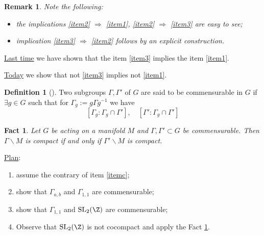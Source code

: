 \documentclass[a4paper,12pt]{article}
\newtheorem{remark}{Remark}
\newtheorem{fact}{Fact}
\theoremstyle{definition}
\newtheorem{definition}{Definition}
\renewcommand{\implies}{\Rightarrow}
\begin{document}
\begin{remark}
	Note the following:\begin{itemize}
		\item the implications \ref{item2} $\implies$ \ref{item1}, \ref{item2} $\implies$ \ref{item3} are easy to see;
		\item implication \ref{item3} $\implies$ \ref{item2} follows by an explicit construction.
	\end{itemize}
\end{remark}

\underline{Last time} we have shown that the item \ref{item3} implies the item \ref{item1}.

\underline{Today} we show that not \ref{item3} implies not \ref{item1}.

\begin{definition}[{\cite[p.36]{bergeron2016spectrum}}]
	Two subgroups $\Gamma,\Gamma'$ of $G$ are said to be commensurable in $G$ if $\exists g\in G$ such that for $\Gamma_{g}:=g\Gamma g^{-1}$ we have\begin{equation*}
		\left[  \Gamma_g:\Gamma_g
		\cap \Gamma'\right],\quad \left[ \Gamma':\Gamma_g\cap \Gamma' \right]
	\end{equation*}
\end{definition}

\begin{fact}\label{fact:1}
	Let $G$ be acting on a manifold $M$ and $\Gamma,\Gamma'\subset G$ be commensurable. Then $\Gamma\backslash M$ is compact if and only if $\Gamma'\backslash M$ is compact.
\end{fact}

\underline{Plan}:\begin{enumerate}
	\item assume the contrary of item \ref{itemc};
	\item show that $\Gamma_{a,b}$ and $\Gamma_{1,1}$ are commensurable;
	\item show that $\Gamma_{1,1}$ and $\mbox{\normalfont SL}_2(\Z)$ are commensurable;
	\item Observe that $\mbox{\normalfont SL}_2(\Z)$ is not cocompact and apply the Fact \ref{fact:1}.
\end{enumerate}



\end{document}

